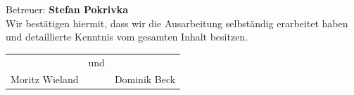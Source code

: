 \documentclass[11pt]{betterallrounder}
\begin{document}
\begin{titlepage}
\begin{center}
        {\large Betreuer: \bfseries{Stefan Pokrivka}}\\[1cm]

        {\large Wir bestätigen hiermit, dass wir die Ausarbeitung selbständig erarbeitet haben und
        detaillierte Kenntnis vom gesamten Inhalt besitzen.}\\[1cm]

        \begin{tabular}{rcl}
            \hrulefill & und & \hrulefill\\
            Moritz Wieland & & Dominik Beck
        \end{tabular}
    
        \vfill
    \end{center}
\end{titlepage}


\newpage

\tableofcontents


%

%
%







\end{document}
